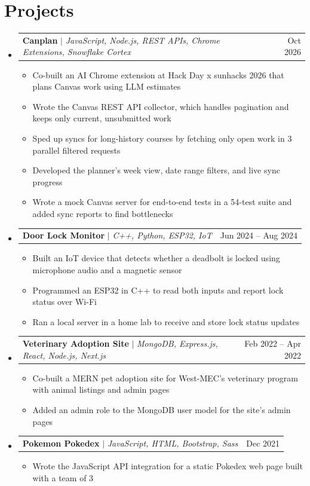 \documentclass[letterpaper,11pt]{article}
\makeatletter
\newcommand{\resumeItem}[1]{
  \item\small{
    {#1 \vspace{-2pt}}
  }
}
\newcommand{\resumeProjectHeading}[2]{
    \item
    \begin{tabular*}{0.97\textwidth}{l@{\extracolsep{\fill}}r}
      \small#1 & #2 \\
    \end{tabular*}\vspace{-7pt}
}
\newcommand{\resumeSubHeadingListStart}{\begin{itemize}[leftmargin=0.15in, label={}]}
\newcommand{\resumeSubHeadingListEnd}{\end{itemize}}
\newcommand{\resumeItemListStart}{\begin{itemize}}
\newcommand{\resumeItemListEnd}{\end{itemize}\vspace{-5pt}}
\makeatother
\begin{document}
\section{Projects}
    \resumeSubHeadingListStart
      \resumeProjectHeading
          {\textbf{Canplan} $|$ \emph{JavaScript, Node.js, REST APIs, Chrome Extensions, Snowflake Cortex}}{Oct 2026}
          \resumeItemListStart
            \resumeItem{Co-built an AI Chrome extension at Hack Day x sunhacks 2026 that plans Canvas work using LLM estimates}
            \resumeItem{Wrote the Canvas REST API collector, which handles pagination and keeps only current, unsubmitted work}
            \resumeItem{Sped up syncs for long-history courses by fetching only open work in 3 parallel filtered requests}
            \resumeItem{Developed the planner's week view, date range filters, and live sync progress}
            \resumeItem{Wrote a mock Canvas server for end-to-end tests in a 54-test suite and added sync reports to find bottlenecks}
          \resumeItemListEnd
      \resumeProjectHeading
          {\textbf{Door Lock Monitor} $|$ \emph{C++, Python, ESP32, IoT}}{Jun 2024 -- Aug 2024}
          \resumeItemListStart
            \resumeItem{Built an IoT device that detects whether a deadbolt is locked using microphone audio and a magnetic sensor}
            \resumeItem{Programmed an ESP32 in C++ to read both inputs and report lock status over Wi-Fi}
            \resumeItem{Ran a local server in a home lab to receive and store lock status updates}
          \resumeItemListEnd
      \resumeProjectHeading
          {\textbf{Veterinary Adoption Site} $|$ \emph{MongoDB, Express.js, React, Node.js, Next.js}}{Feb 2022 -- Apr 2022}
          \resumeItemListStart
            \resumeItem{Co-built a MERN pet adoption site for West-MEC's veterinary program with animal listings and admin pages}
            \resumeItem{Added an admin role to the MongoDB user model for the site's admin pages}
          \resumeItemListEnd
      \resumeProjectHeading
          {\textbf{Pokemon Pokedex} $|$ \emph{JavaScript, HTML, Bootstrap, Sass}}{Dec 2021}
          \resumeItemListStart
            \resumeItem{Wrote the JavaScript API integration for a static Pokedex web page built with a team of 3}
          \resumeItemListEnd
    \resumeSubHeadingListEnd



%
\end{document}
